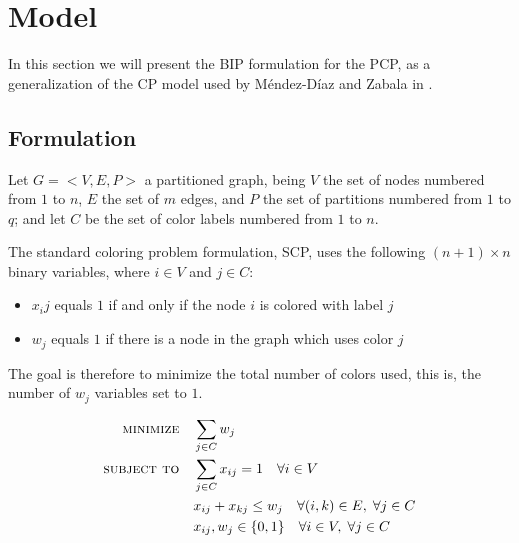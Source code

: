 \section{Model}

In this section we will present the BIP formulation for the PCP, as a generalization of the CP model used by M\'endez-D\'iaz and Zabala in \cite{mendez2008cutting}.

\subsection{Formulation}

Let $G = <V,E,P>$ a partitioned graph, being $V$ the set of nodes numbered from $1$ to $n$, $E$ the set of $m$ edges, and $P$ the set of partitions numbered from $1$ to $q$; and let $C$ be the set of color labels numbered from $1$ to $n$.

The standard coloring problem formulation, SCP, uses the following $(n + 1) \times n$ binary variables, where $i \in V$ and $j \in C$:
\begin{itemize}
\item $x_ij$ equals $1$ if and only if the node $i$ is colored with label $j$
\item $w_j$ equals $1$ if there is a node in the graph which uses color $j$
\end{itemize}

The goal is therefore to minimize the total number of colors used, this is, the number of $w_j$ variables set to $1$.

\begin{align}
\text{\textsc{minimize}} \quad & \sum_{j \in C} w_j \label{eqn:obj} \\
\text{\textsc{subject to}} \quad & \sum_{j \in C} x_{ij} = 1 \quad \forall i \in V \label{eqn:colorvertex} \\
& x_{ij} + x_{kj} \leq w_j \quad \forall (i,k) \in E, \; \forall j \in C \\
& x_{ij}, w_{j} \in \{0,1\} \quad \forall i \in V, \; \forall j \in C
\end{align}


